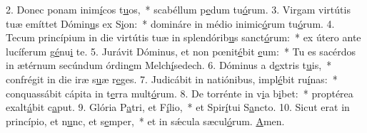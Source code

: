 2. Donec ponam inim\uline{í}cos t\uline{u}os,~* scabéllum p\uline{e}dum tu\uline{ó}rum.
3. Virgam virtútis tuæ emíttet Dómin\uline{u}s ex S\uline{i}on:~* domináre in médio inimic\uline{ó}rum tu\uline{ó}rum.
4. Tecum princípium in die virtútis tuæ in splendórib\uline{u}s sanct\uline{ó}rum:~* ex útero ante lucíferum g\uline{é}nu\uline{i} te.
5. Jurávit Dóminus, et non pœnit\uline{é}bit \uline{e}um:~* Tu es sacérdos in ætérnum secúndum órdin\uline{e}m Melch\uline{í}sedech.
6. Dóminus a d\uline{e}xtris t\uline{u}is,~* confrégit in die iræ s\uline{u}æ r\uline{e}ges.
7. Judicábit in natiónibus, impl\uline{é}bit ru\uline{í}nas:~* conquassábit cápita in t\uline{e}rra mult\uline{ó}rum.
8. De torrénte in v\uline{i}a b\uline{i}bet:~* proptérea exalt\uline{á}bit c\uline{a}put.
9. Glória P\uline{a}tri, et F\uline{í}lio,~* et Spir\uline{í}tui S\uline{a}ncto.
10. Sicut erat in princípio, et n\uline{u}nc, et s\uline{e}mper,~* et in sǽcula sæcul\uline{ó}rum. \uline{A}men.
